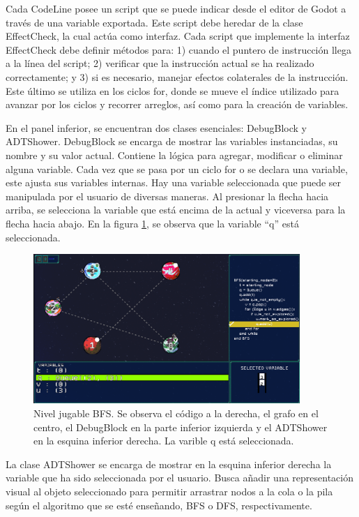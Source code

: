 Cada CodeLine posee un script que se puede indicar desde el editor de Godot a través de una variable exportada. Este script debe heredar de la clase EffectCheck, la cual actúa como interfaz. Cada script que implemente la interfaz EffectCheck debe definir métodos para: 1) cuando el puntero de instrucción llega a la línea del script; 2) verificar que la instrucción actual se ha realizado correctamente; y 3) si es necesario, manejar efectos colaterales de la instrucción. Este último se utiliza en los ciclos for, donde se mueve el índice utilizado para avanzar por los ciclos y recorrer arreglos, así como para la creación de variables.

En el panel inferior, se encuentran dos clases esenciales: DebugBlock y ADTShower. DebugBlock se encarga de mostrar las variables instanciadas, su nombre y su valor actual. Contiene la lógica para agregar, modificar o eliminar alguna variable. Cada vez que se pasa por un ciclo for o se declara una variable, este ajusta sus variables internas. Hay una variable seleccionada que puede ser manipulada por el usuario de diversas maneras. Al presionar la flecha hacia arriba, se selecciona la variable que está encima de la actual y viceversa para la flecha hacia abajo. En la figura \ref{BFSFullGame}, se observa que la variable ``q'' está seleccionada.

\begin{figure}[h]
	\centering
	\includegraphics[width=0.9\textwidth]{imagenes/BFSFullGame.png}
	\caption{Nivel jugable BFS. Se observa el código a la derecha, el grafo en el centro, el DebugBlock en la parte inferior izquierda y el ADTShower en la esquina inferior derecha. La varible q está seleccionada.}
	\label{BFSFullGame}
\end{figure}

La clase ADTShower se encarga de mostrar en la esquina inferior derecha la variable que ha sido seleccionada por el usuario. Busca añadir una representación visual al objeto seleccionado para permitir arrastrar nodos a la cola o la pila según el algoritmo que se esté enseñando, BFS o DFS, respectivamente.

